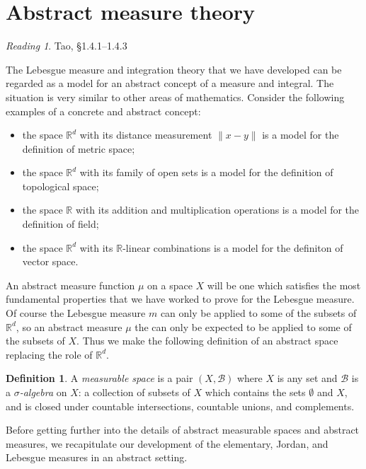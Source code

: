 \documentclass[11pt,oneside]{amsbook}
\newcommand{\RR}{{\mathbb R}}
\theoremstyle{definition}
\theoremstyle{plain}
\theoremstyle{definition}
\newtheorem{defn}[thm]{Definition}
\theoremstyle{remark}
\newtheorem*{reading}{Reading}
\numberwithin{equation}{section}
\numberwithin{figure}{section}
\begin{document}
\newpage
\section{Abstract measure theory}

\begin{reading}
  Tao, \S 1.4.1--1.4.3
\end{reading}

The Lebesgue measure and integration theory that we have developed can be regarded as a model for an abstract concept of a measure and integral. The situation is very similar to other areas of mathematics. Consider the following examples of a concrete and abstract concept:
\begin{itemize}
\item the space $\RR^d$ with its distance measurement $\|x-y\|$ is a model for the definition of metric space;
\item the space $\RR^d$ with its family of open sets is a model for the definition of topological space;
\item the space $\RR$ with its addition and multiplication operations is a model for the definition of field;
\item the space $\RR^d$ with its $\RR$-linear combinations is a model for the definiton of vector space.
\end{itemize}

An abstract measure function $\mu$ on a space $X$ will be one which satisfies the most fundamental properties that we have worked to prove for the Lebesgue measure. Of course the Lebesgue measure $m$ can only be applied to some of the subsets of $\RR^d$, so an abstract measure $\mu$ the can only be expected to be applied to some of the subsets of $X$. Thus we make the following definition of an abstract space replacing the role of $\RR^d$.

\begin{defn}
  A \emph{measurable space} is a pair $(X,\mathcal B)$ where $X$ is any set and $\mathcal B$ is a \emph{$\sigma$-algebra} on $X$: a collection of subsets of $X$ which contains the sets $\emptyset$ and $X$, and is closed under countable intersections, countable unions, and complements.
\end{defn}

Before getting further into the details of abstract measurable spaces and abstract measures, we recapitulate our development of the elementary, Jordan, and Lebesgue measures in an abstract setting.
\end{document}
